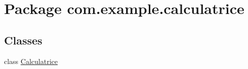 \hypertarget{namespacecom_1_1example_1_1calculatrice}{\section{Package com.\-example.\-calculatrice}
\label{namespacecom_1_1example_1_1calculatrice}
}
\subsection*{Classes}
\begin{DoxyCompactItemize}
\item 
class \hyperlink{classcom_1_1example_1_1calculatrice_1_1_calculatrice}{Calculatrice}
\end{DoxyCompactItemize}
